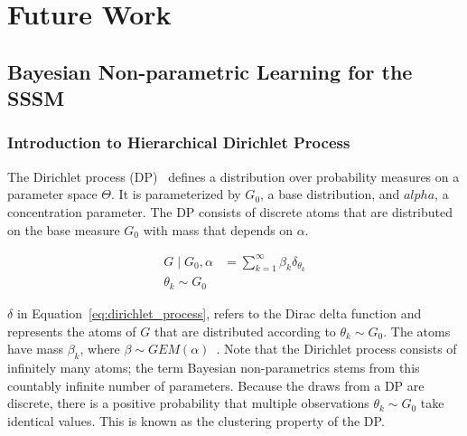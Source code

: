 \section{Future Work}
\subsection{Bayesian Non-parametric Learning for the SSSM}\label{sec:non-parameteric}
\subsubsection{Introduction to Hierarchical Dirichlet Process}
The Dirichlet process (DP)~\citep{ferguson1973bayesian} defines a distribution over probability measures on a parameter space $\Theta$. It is parameterized by $G_0$, a base distribution, and $alpha$, a concentration parameter. The DP consists of discrete atoms that are distributed on the base measure $G_0$ with mass that depends on $\alpha$.

\begin{equation}\label{eq:dirichlet_process}
  \begin{split}
    G \mid G_0, \alpha &= \sum\limits_{k=1}^{\infty} \beta_k \delta_{\theta_k} \\
    \theta_k \sim G_0
  \end{split}
\end{equation}

$\delta$ in Equation~\ref{eq:dirichlet_process}, refers to the Dirac delta function and represents the atoms of $G$ that are distributed according to $\theta_k \sim G_0$. The atoms have mass $\beta_k$, where $\beta \sim GEM(\alpha)$~\citep{neal2000markov}. Note that the Dirichlet process consists of infinitely many atoms; the term Bayesian non-parametrics stems from this countably infinite number of parameters. Because the draws from a DP are discrete, there is a positive probability that multiple observations $\theta_k \sim G_0$ take identical values. This is known as the clustering property of the DP.

